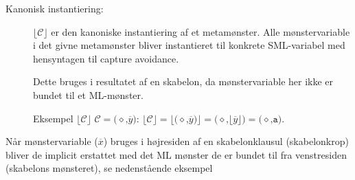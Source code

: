 \documentclass[oneside]{memoir}
\newcommand{\floor}[1]{\ensuremath{\lfloor #1 \rfloor}}
\theoremstyle{definition}
\begin{document}
\begin{description}
\item[Kanonisk instantiering:] $\floor{\mathcal{C}}$ er den kanoniske
  instantiering af et metamønster. Alle mønstervariable i det givne metamønster bliver
  instantieret til konkrete SML-variabel med hensyntagen til capture
  avoidance.

  Dette bruges i resultatet af en skabelon, da mønstervariable her ikke er
  bundet til et ML-mønster.

  Eksempel $\floor{\mathcal{C}}$ $\mathcal{C} = \texttt{(}\diamond\texttt{,} \overline{y}\texttt{)}$:
  $\floor{\mathcal{C}} = \floor{\texttt{(}\diamond\texttt{,} \overline{y}\texttt{)}} = \texttt{(}\diamond\texttt{,}
  \floor{\overline{y}}\texttt{)} = \texttt{(}\diamond\texttt{,} \texttt{a)}$.
 
\end{description}

Når mønstervariable ($\overline{x}$) bruges i højresiden af en skabelonklausul
(skabelonkrop) bliver de implicit erstattet med det ML mønster de er bundet
til fra venstresiden (skabelons mønsteret), se nedenstående eksempel
\end{document}

